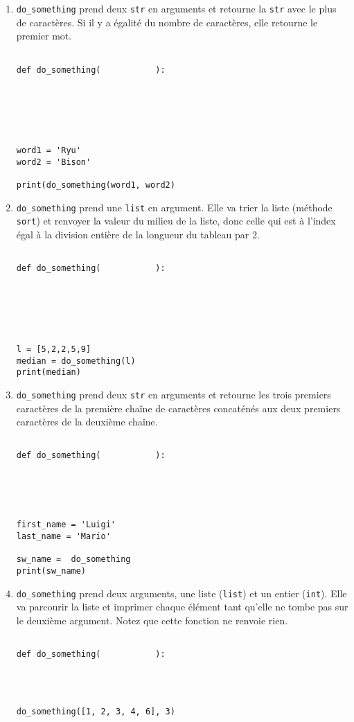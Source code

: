 \documentclass[12pt,a4paper]{article}
\newcommand{\codeintext}[1]{\texttt{#1}}
\begin{document}
\begin{enumerate}
\item
\codeintext{do\_something} prend deux \codeintext{str} en arguments et retourne la \codeintext{str} avec le plus de caractères.
Si il y a égalité du nombre de caractères, elle retourne le premier mot.
\begin{lstlisting}

def do_something(           ):






word1 = 'Ryu'
word2 = 'Bison'

print(do_something(word1, word2)
\end{lstlisting}


\item
\codeintext{do\_something} prend une \codeintext{list} en argument.
Elle va trier la liste (méthode \codeintext{sort}) et renvoyer la valeur du milieu de la liste, donc celle qui est à l'index égal à la division entière de la longueur du tableau par 2.

\begin{lstlisting}

def do_something(           ):






l = [5,2,2,5,9]
median = do_something(l)
print(median)
\end{lstlisting}

\pagebreak
\item
\codeintext{do\_something} prend deux \codeintext{str} en arguments et retourne les trois premiers caractères de la première chaîne de caractères concaténés aux deux premiers caractères de la deuxième chaîne.
\begin{lstlisting}

def do_something(           ):





first_name = 'Luigi'
last_name = 'Mario'

sw_name =  do_something
print(sw_name)
\end{lstlisting}


\item
\codeintext{do\_something} prend deux arguments, une liste (\codeintext{list}) et un entier (\codeintext{int}).
Elle va parcourir la liste et imprimer chaque élément tant qu'elle ne tombe pas sur le deuxième argument.
Notez que cette fonction ne renvoie rien.
\begin{lstlisting}

def do_something(           ):




do_something([1, 2, 3, 4, 6], 3)
\end{lstlisting}
\end{enumerate}
\end{document}
